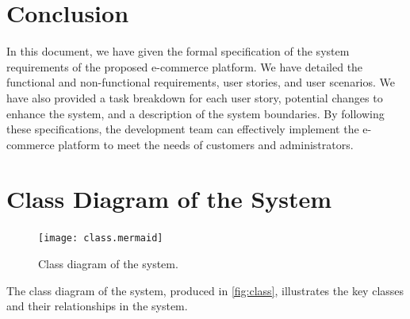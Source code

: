 \documentclass[twoside,a4paper,journal]{IEEEtran}
\begin{document}
\section{Conclusion}
In this document, we have given the formal specification of the system
requirements of the proposed e-commerce platform.
We have detailed the functional and non-functional requirements, user stories,
and user scenarios.
We have also provided a task breakdown for each user story, potential changes
to enhance the system, and a description of the system boundaries.
By following these specifications, the development team can effectively
implement the e-commerce platform to meet the needs of customers and
administrators.


%


\appendices
\section{Class Diagram of the System}
\begin{figure}[!t]
\centering
\texttt{[image: class.mermaid]}
\caption{Class diagram of the system.}
\label{fig:class}
\end{figure}
The class diagram of the system, produced in \autoref{fig:class}, illustrates
the key classes and their relationships in the system.
\end{document}
